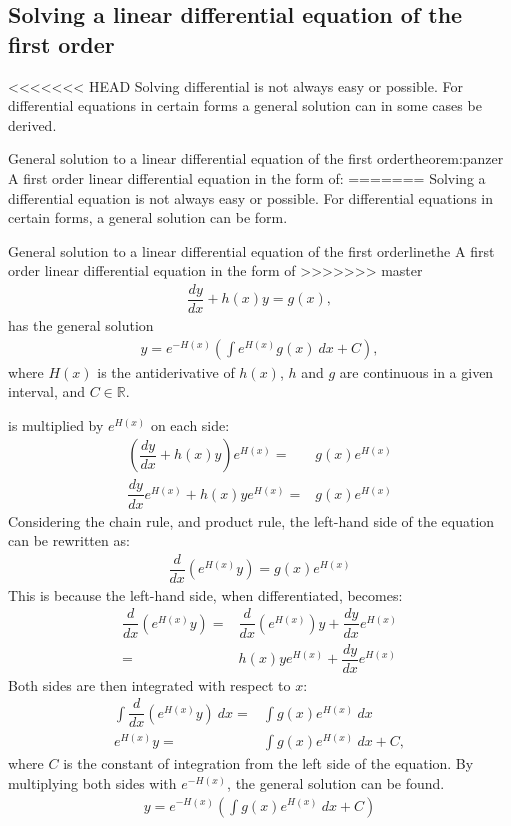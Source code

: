 \subsection{Solving a linear differential equation of the first order}
<<<<<<< HEAD
Solving differential  is not always easy or possible. For differential equations in certain forms a general solution can in some cases be derived.
\begin{theorem}{General solution to a linear differential equation of the first order}{theorem:panzer}
A first order linear differential equation in the form of:
=======
Solving  a differential equation is not always easy or possible. For differential equations in certain forms, a general solution can be form.

\begin{theorem}{General solution to a linear differential equation of the first order}{linethe}
A first order linear differential equation in the form of
>>>>>>> master
\begin{align} \label{FODE_form}
\dfrac{dy}{dx}+h(x)y=g(x),
\end{align}
has the general solution
\begin{align} \label{FODE_solution}
y=e^{-H(x)}\left(\int e^{H(x)}g(x)\ dx+C\right),
\end{align}
where $H(x)$ is the antiderivative of $h(x)$, $h$ and $g$ are continuous in a given interval, and $C\in \mathbb{R}$.
\end{theorem}

\begin{prof}{}{}
 is multiplied by $e^{H(x)}$ on each side:
\begin{align*}
\left(\dfrac{dy}{dx}+h(x)y\right)e^{H(x)}=&g(x)e^{H(x)}
\\
\dfrac{dy}{dx}e^{H(x)}+h(x)ye^{H(x)}=&g(x)e^{H(x)}
\end{align*}
Considering the chain rule, and product rule, the left-hand side of the equation can be rewritten as:
\begin{align*}
\dfrac{d}{dx}\left(e^{H(x)}y\right)=g(x)e^{H(x)}
\end{align*}
This is because the left-hand side, when differentiated, becomes:
\begin{align*}
\dfrac{d}{dx}\left(e^{H(x)}y\right)=&\dfrac{d}{dx}\left(e^{H(x)}\right)y+\dfrac{dy}{dx}e^{H(x)} \\
 =& h(x)ye^{H(x)}+\dfrac{dy}{dx}e^{H(x)}
\end{align*}
Both sides are then integrated with respect to $x$:
\begin{align*}
\int\dfrac{d}{dx}\left(e^{H(x)}y\right)\ dx=&\int g(x)e^{H(x)}\ dx
\\
e^{H(x)}y=&\int g(x)e^{H(x)}\ dx+C,
\end{align*}
where $C$ is the constant of integration from the left side of the  equation. By multiplying both sides with $e^{-H(x)}$, the general solution can be found.
\begin{align}
y=e^{-H(x)}\left(\int g(x)e^{H(x)}\ dx+C\right)
\end{align}
\end{prof}


\end{theorem}
